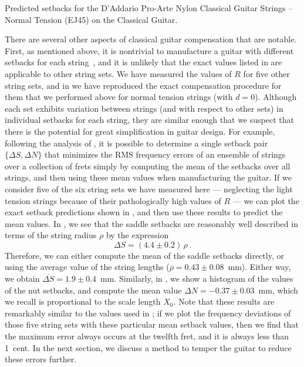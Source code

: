  \begin{table}[htbp]
  \centering
  \caption{\label{tbl:ej45_setbacks} Predicted setbacks for the D'Addario Pro-Arte Nylon Classical Guitar Strings -- Normal Tension (EJ45) on the Classical Guitar.}
  
\end{table}%

There are several other aspects of classical guitar compensation that are notable. First, as mentioned above, it is nontrivial to manufacture a guitar with different setbacks for each string~\cite{ref:byers1996cgi}, and it is unlikely that the exact values listed in  are applicable to other string sets. We have measured the values of $R$ for five other string sets, and in  we have reproduced the exact compensation procedure for them that we performed above for normal tension strings (with $d = 0$). Although each set exhibits variation between strings (and with respect to other sets) in individual setbacks for each string, they are similar enough that we suspect that there is the potential for great simplification in guitar design. For example, following the analysis of , it is possible to determine a single setback pair $\{\Delta S, \Delta N\}$ that minimizes the RMS frequency errors of an ensemble of strings over a collection of frets simply by computing the mean of the setbacks over all strings, and then using these mean values when manufacturing the guitar. If we consider five of the six string sets we have measured here --- neglecting the light tension strings because of their pathologically high values of $R$ --- we can plot the exact setback predictions shown in , and then use these results to predict the mean values. In , we see that the saddle setbacks are reasonably well described in terms of the string radius $\rho$ by the expression
\begin{equation}
  \Delta S = (4.4 \pm 0.2)\, \rho\, .
\end{equation}
Therefore, we can either compute the mean of the saddle setbacks directly, or using the average value of the string lengths ($\overline{\rho} = 0.43 \pm 0.08$~mm). Either way, we obtain $\overline{\Delta S} = 1.9 \pm 0.4$~mm. Similarly, in , we show a histogram of the values of the nut setbacks, and compute the mean value $\Delta N = -0.37 \pm 0.03$~mm, which we recall is proportional to the scale length $X_0$. Note that these results are remarkably similar to the values used in ; if we plot the frequency deviations of those five string sets with these particular mean setback values, then we find that the maximum error always occurs at the twelfth fret, and it is always less than 1~cent. In the next section, we discuss a method to temper the guitar to reduce these errors further.

